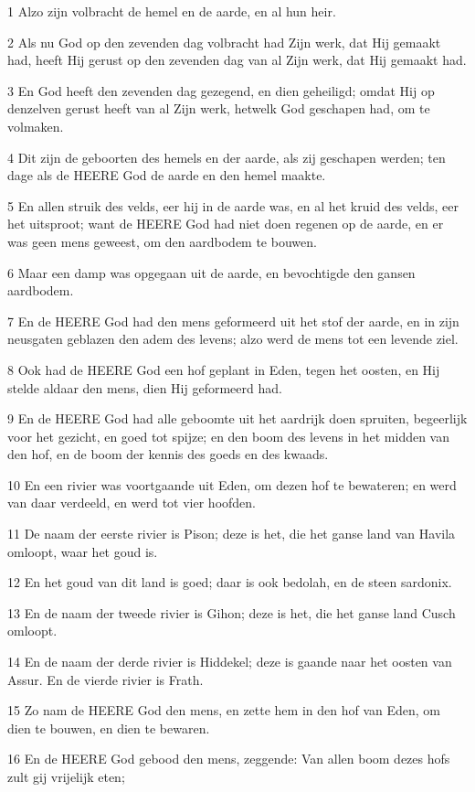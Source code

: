 \par 1 Alzo zijn volbracht de hemel en de aarde, en al hun heir.
\par 2 Als nu God op den zevenden dag volbracht had Zijn werk, dat Hij gemaakt had, heeft Hij gerust op den zevenden dag van al Zijn werk, dat Hij gemaakt had.
\par 3 En God heeft den zevenden dag gezegend, en dien geheiligd; omdat Hij op denzelven gerust heeft van al Zijn werk, hetwelk God geschapen had, om te volmaken.
\par 4 Dit zijn de geboorten des hemels en der aarde, als zij geschapen werden; ten dage als de HEERE God de aarde en den hemel maakte.
\par 5 En allen struik des velds, eer hij in de aarde was, en al het kruid des velds, eer het uitsproot; want de HEERE God had niet doen regenen op de aarde, en er was geen mens geweest, om den aardbodem te bouwen.
\par 6 Maar een damp was opgegaan uit de aarde, en bevochtigde den gansen aardbodem.
\par 7 En de HEERE God had den mens geformeerd uit het stof der aarde, en in zijn neusgaten geblazen den adem des levens; alzo werd de mens tot een levende ziel.
\par 8 Ook had de HEERE God een hof geplant in Eden, tegen het oosten, en Hij stelde aldaar den mens, dien Hij geformeerd had.
\par 9 En de HEERE God had alle geboomte uit het aardrijk doen spruiten, begeerlijk voor het gezicht, en goed tot spijze; en den boom des levens in het midden van den hof, en de boom der kennis des goeds en des kwaads.
\par 10 En een rivier was voortgaande uit Eden, om dezen hof te bewateren; en werd van daar verdeeld, en werd tot vier hoofden.
\par 11 De naam der eerste rivier is Pison; deze is het, die het ganse land van Havila omloopt, waar het goud is.
\par 12 En het goud van dit land is goed; daar is ook bedolah, en de steen sardonix.
\par 13 En de naam der tweede rivier is Gihon; deze is het, die het ganse land Cusch omloopt.
\par 14 En de naam der derde rivier is Hiddekel; deze is gaande naar het oosten van Assur. En de vierde rivier is Frath.
\par 15 Zo nam de HEERE God den mens, en zette hem in den hof van Eden, om dien te bouwen, en dien te bewaren.
\par 16 En de HEERE God gebood den mens, zeggende: Van allen boom dezes hofs zult gij vrijelijk eten;
